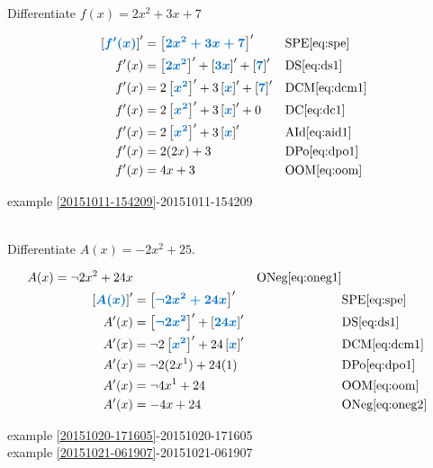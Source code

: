 \documentclass[20150903-160354-rs2.2-MarksMathNotebook.tex]{subfiles}
\begin{document}
\begin{example}[id:20151011-195002] \label{20151011-195002} \hfill \\
Differentiate $f(x)=2x^2+3x+7$

\soln

\solnsteps
\begin{align*}
\farg{f'(x)}' &= \farg{2x^2+3x+7}' && \text{SPE} \eqref{eq:spe} \\
f'(x) &= \farg{2x^2}'+\farg{3x}'+\farg{7}' && \text{DS} \eqref{eq:ds1} \\
f'(x) &= 2 \farg{x^2}' + 3\farg{x}' + \farg{7}' && \text{DCM} \eqref{eq:dcm1} \\
f'(x) &= 2 \farg{x^2}' + 3\farg{x}' + 0 && \text{DC} \eqref{eq:dc1} \\
f'(x) &= 2 \farg{x^2}' + 3\farg{x}' && \text{AId} \eqref{eq:aid1} \\
f'(x) &= 2(2x)+3 && \text{DPo} \eqref{eq:dpo1} \\
f'(x) &= 4x + 3 && \text{OOM} \eqref{eq:oom} 
\end{align*}

\qdepend

\qdependlist
example \ref{20151011-154209}-20151011-154209

\end{example}


\begin{example}[id:20151021-054427] \label{20151021-054427} \hfill \\
Differentiate $A(x)=-2x^2+25$.

\soln

\solnsteps
\begin{align*}
A(x)= \neg 2x^2+24x && \text{ONeg} \eqref{eq:oneg1} \\
\farg{A(x)}' &= \farg{\neg 2x^2+24x}' && \text{SPE} \eqref{eq:spe} \\
A'(x) &= \farg{\neg 2x^2}'+\farg{24x}' && \text{DS} \eqref{eq:ds1} \\
A'(x) &= \neg 2\farg{x^2}' + 24\farg{x}' && \text{DCM} \eqref{eq:dcm1} \\
A'(x) &= \neg 2(2x^1) + 24(1) && \text{DPo} \eqref{eq:dpo1} \\
A'(x) &= \neg 4 x^1 + 24 && \text{OOM} \eqref{eq:oom} \\
A'(x) &= -4x+24 && \text{ONeg} \eqref{eq:oneg2} 
\end{align*}

\qdepend

\qdependlist
example \ref{20151020-171605}-20151020-171605\\

example \ref{20151021-061907}-20151021-061907


\end{example}
\end{document}
